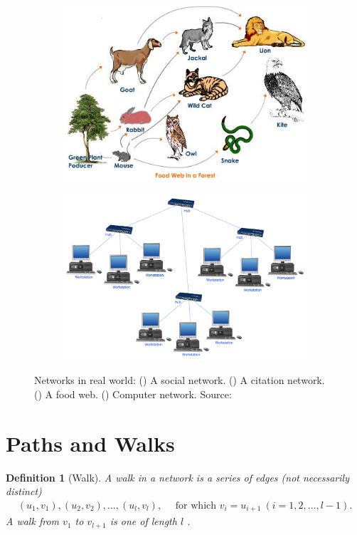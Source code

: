 \documentclass[10pt,a4paper]{article}
\newtheorem{defn}{Definition}
\begin{document}
\begin{figure}[H]
		\begin{subfigure}[b]{0.4\textwidth}
			\includegraphics[width=\textwidth]{images/foodweb.jpeg}
			\caption{}
			\label{foodweb}
		\end{subfigure}
		\quad 
		\begin{subfigure}[b]{0.4\textwidth}
			\includegraphics[width=\textwidth]{images/computer-2.png}
			\caption{}
			\label{internet}
		\end{subfigure}
		\caption{Networks in real world: () A social network. () A citation network. () A food web.  () Computer network. Source: \citep{googleimages}}
	\end{figure} 

\section{Paths and Walks}
\begin{defn}[Walk]
	A walk in a network is a series of edges (not necessarily distinct)
	\begin{eqnarray*}
		(u_1,v_1),(u_2,v_2),\ldots,(u_l,v_l), \quad \text{ for which }  v_i=u_{i+1} ~(i=1,2,\ldots,l-1).
	\end{eqnarray*}
	A walk from $v_1 $ to $v_{l+1}$ is one of length $l$ \citep{estrada2015first}.
\end{defn}
\end{document}
